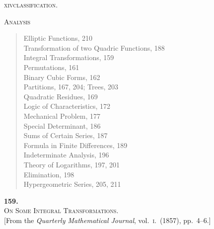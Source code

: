 \documentclass[11pt]{article}
\begin{document}
\newpage

\begin{center}
\small\textsc{xiv}\hfill\textsc{classification.}\hfill\mbox{}
\end{center}

\medskip

\noindent\textsc{Analysis}

\medskip

\begin{quote}
\noindent Elliptic Functions, 210\\
Transformation of two Quadric Functions, 188\\
Integral Transformations, 159\\
Permutations, 161\\
Binary Cubic Forms, 162\\
Partitions, 167, 204; Trees, 203\\
Quadratic Residues, 169\\
Logic of Characteristics, 172\\
Mechanical Problem, 177\\
Special Determinant, 186\\
Sums of Certain Series, 187\\
Formula in Finite Differences, 189\\
Indeterminate Analysis, 196\\
Theory of Logarithms, 197, 201\\
Elimination, 198\\
Hypergeometric Series, 205, 211
\end{quote}

\newpage


\setcounter{page}{1}
\renewcommand{\thepage}{\arabic{page}}

\begin{center}
{\large\textbf{159.}}\\[1em]
{\large\scshape On Some Integral Transformations.}\\[1em]
{\small [From the \textit{Quarterly Mathematical Journal}, vol.~\textsc{i}.\ (1857), pp.~4--6.]}
\end{center}

\bigskip
\end{document}
